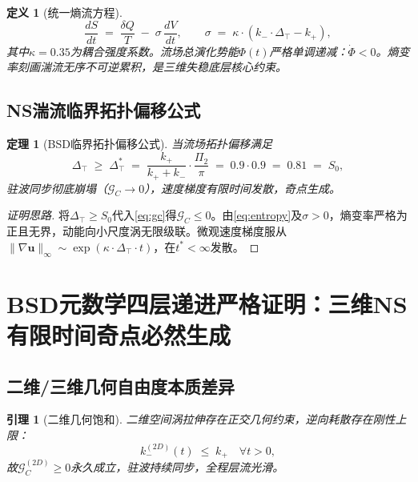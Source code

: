 \documentclass[11pt,a4paper]{ctexart}
\newtheorem{theorem}{定理}
\newtheorem{lemma}{引理}
\newtheorem{definition}{定义}
\theoremstyle{remark}
\newcommand{\PiT}{\Pi_{2}}
\newcommand{\kplus}{k_{+}}
\newcommand{\kminus}{k_{-}}
\newcommand{\Szero}{S_{0}}
\newcommand{\GC}{\mathcal{G}_{\!C}}
\newcommand{\Dtop}{\Delta_{\!\top}}
\newcommand{\uvec}{\bm{u}}
\begin{document}
\begin{definition}[统一熵流方程]\label{def:entropy}
\begin{equation}\label{eq:entropy}
\frac{dS}{dt} \;=\; \frac{\delta Q}{T} \;-\; \sigma\,\frac{dV}{dt},
\qquad \sigma \;=\; \kappa\cdot(\kminus\cdot\Dtop - \kplus),
\end{equation}
其中$\kappa=0.35$为耦合强度系数。流场总演化势能$\Phi(t)$严格单调递减：$\dot\Phi<0$。熵变率刻画湍流无序不可逆累积，是三维失稳底层核心约束。
\end{definition}

\subsection{NS湍流临界拓扑偏移公式}\label{sec:critical}

\begin{theorem}[BSD临界拓扑偏移公式]\label{thm:critical}
当流场拓扑偏移满足
\begin{equation}\label{eq:critical}
\Dtop \;\ge\; \Dtop^{\!*} \;=\; \frac{\kplus}{\kplus+\kminus}\cdot\frac{\PiT}{\pi} \;=\; 0.9\cdot 0.9 \;=\; 0.81 \;=\; \Szero,
\end{equation}
驻波同步彻底崩塌（$\GC\to 0$），速度梯度有限时间发散，奇点生成。
\end{theorem}

\begin{proof}[证明思路]
将$\Dtop\ge\Szero$代入\eqref{eq:gc}得$\GC\le 0$。由\eqref{eq:entropy}及$\sigma>0$，熵变率严格为正且无界，动能向小尺度涡无限级联。微观速度梯度服从$\|\nabla\uvec\|_{\infty}\sim\exp(\kappa\cdot\Dtop\cdot t)$，在$t^{*}<\infty$发散。
\end{proof}

\section{BSD元数学四层递进严格证明：三维NS有限时间奇点必然生成}\label{sec:proof}

\subsection{二维/三维几何自由度本质差异}\label{sec:geom}

\begin{lemma}[二维几何饱和]\label{lem:2d}
二维空间涡拉伸存在正交几何约束，逆向耗散存在刚性上限：
\begin{equation}\label{eq:2d-bound}
\kminus^{(2D)}(t) \;\le\; \kplus \quad\forall t>0,
\end{equation}
故$\GC^{(2D)}\ge 0$永久成立，驻波持续同步，全程层流光滑。
\end{lemma}
\end{document}
